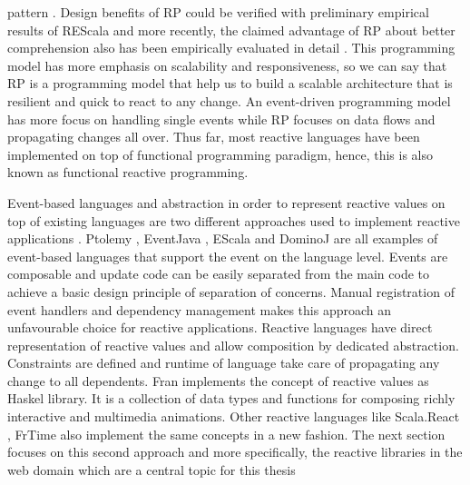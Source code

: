 pattern \cite{Meyerovich:2009:FPL:1639949.1640091,Bainomugisha:2013:SRP:2501654.2501666,EPFL-REPORT-176887}. Design benefits of RP could be verified with preliminary empirical results of REScala and more recently, the claimed advantage of RP about better comprehension also has been empirically evaluated in detail \cite{7827078}.
This programming model has more emphasis on scalability and responsiveness, so we can say that RP is a programming model that help us to build a scalable architecture that is resilient and quick to react to any change. An event-driven programming model has more focus on handling single events while RP focuses on data flows and propagating changes all over.
Thus far, most reactive languages have been implemented on top of functional programming paradigm, hence, this is also known as functional reactive programming.

Event-based languages and abstraction in order to represent reactive values on top of existing languages are two different approaches used to implement reactive applications \cite{Salvaneschi:2014:RBO:2577080.2577083}. 
Ptolemy \cite{Rajan2008}, EventJava \cite{Eugster2009}, EScala \cite{Gasiunas:2011:EME:1960275.1960303} and DominoJ \cite{Zhuang:2013:MSS:2451436.2451460} are all examples of event-based languages that support the event on the language level. Events are composable and update code can be easily separated from the main code to achieve a basic design principle of separation of concerns. Manual registration of event handlers and dependency management makes this approach an unfavourable choice for reactive applications.
Reactive languages have direct representation of reactive values and allow composition by dedicated abstraction. Constraints are defined and runtime of language take care of propagating any change to all dependents.
Fran \cite{Elliott:1997:FRA:258949.258973} implements the concept of reactive values as Haskel library. It is a collection of data types and functions for composing richly interactive and multimedia animations. Other reactive languages like Scala.React \cite{EPFL-REPORT-176887}, FrTime \cite{Cooper2006} also implement the same concepts in a new fashion.
The next section focuses on this second approach and more specifically, the reactive libraries in the web domain which are a central topic for this thesis

